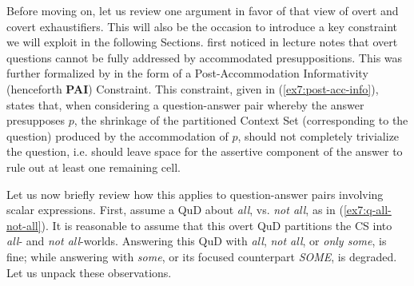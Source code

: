 Before moving on, let us review one argument in favor of that view of overt and covert exhaustifiers. This will also be the occasion to introduce a key constraint we will exploit in the following Sections. \citet{Heim2015} first noticed in lecture notes that overt questions cannot be fully addressed by accommodated presuppositions. This was further formalized by \citet{Doron2024} in the form of a Post-Accommodation Informativity (henceforth \textbf{PAI}) Constraint. This constraint, given in (\ref{ex7:post-acc-info}), states that, when considering a question-answer pair whereby the answer presupposes $p$, the shrinkage of the partitioned Context Set (corresponding to the question) produced by the accommodation of $p$, should not completely trivialize the question, i.e. should leave space for the assertive component of the answer to rule out at least one remaining cell.

\begin{exe}
	\label{ex7:post-acc-info}
\end{exe}

Let us now briefly review how this applies to question-answer pairs involving scalar expressions. First, assume a QuD about \textit{all}, vs. \textit{not all}, as in (\ref{ex7:q-all-not-all}). It is reasonable to assume that this overt QuD partitions the CS into \textit{all}- and \textit{not all}-worlds. Answering this QuD with \textit{all}, \textit{not all}, or \textit{only some}, is fine; while answering with \textit{some}, or its focused counterpart \textit{SOME}, is degraded. Let us unpack these observations.

\begin{exe}
	\label{ex7:q-all-not-all}
	\begin{xlist}
	\end{xlist}
\end{exe}

